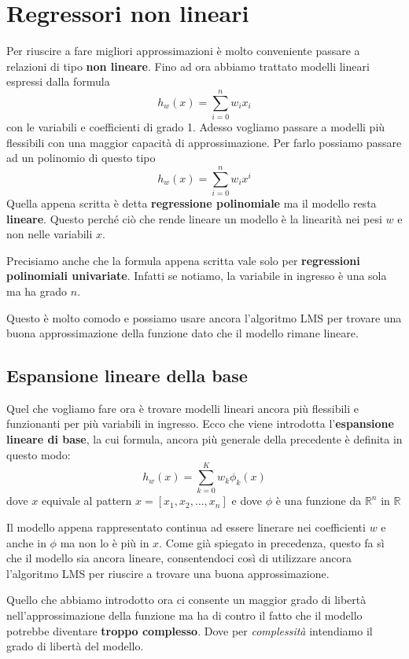 \chapter{Regressori non lineari}
Per riuscire a fare migliori approssimazioni \`e molto conveniente passare a relazioni di tipo \textbf{non lineare}.
Fino ad ora abbiamo trattato modelli lineari espressi dalla formula
\[ h_w(x) = \sum_{i = 0}^n w_i x_i \]
con le variabili e coefficienti di grado 1. Adesso vogliamo passare a modelli pi\`u flessibili con una maggior
capacit\`a di approssimazione. Per farlo possiamo passare ad un polinomio di questo tipo
\[ h_w(x) = \sum_{i = 0}^n w_i x^i \]
Quella appena scritta \`e detta \textbf{regressione polinomiale} ma il modello resta \textbf{lineare}. Questo perch\'e
ci\`o che rende lineare un modello \`e la linearit\`a nei pesi $w$ e non nelle variabili $x$.

Precisiamo anche che la formula appena scritta vale solo per \textbf{regressioni polinomiali univariate}. Infatti se
notiamo, la variabile in ingresso \`e una sola ma ha grado $n$.

Questo \`e molto comodo e possiamo usare ancora l'algoritmo LMS per trovare una buona approssimazione della funzione
dato che il modello rimane lineare.

\section{Espansione lineare della base}
Quel che vogliamo fare ora \`e trovare modelli lineari ancora pi\`u flessibili e funzionanti per pi\`u variabili in
ingresso. Ecco che viene introdotta l'\textbf{espansione lineare di base}, la cui formula, ancora pi\`u generale della
precedente  \`e definita in questo modo:
\[ h_w(x) = \sum_{k = 0}^K w_k \phi_k(x) \]
dove $x$ equivale al pattern $x = [x_1, x_2, \dots, x_n]$ e dove $\phi$ \`e una funzione da
$\mathbb{R}^n$ in $\mathbb{R}$

Il modello appena rappresentato continua ad essere linerare nei coefficienti $w$ e anche in $\phi$ ma non lo \`e pi\`u
in $x$. Come gi\`a spiegato in precedenza, questo fa s\`i che il modello sia ancora lineare, consentendoci cos\`i di
utilizzare ancora l'algoritmo LMS per riuscire a trovare una buona approssimazione.

Quello che abbiamo introdotto ora ci consente un maggior grado di libert\`a nell'approssimazione della funzione ma ha
di contro il fatto che il modello potrebbe diventare \textbf{troppo complesso}. Dove per \emph{complessit\`a} intendiamo
il grado di libert\`a del modello.

